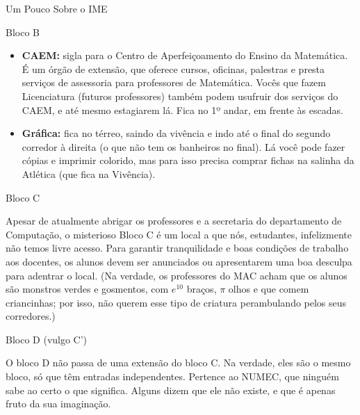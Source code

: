 \begin{secao}{Um Pouco Sobre o IME}
\begin{subsecao}{Bloco B}
\begin{itemize}
\item {\bf CAEM:} sigla para o Centro de Aperfeiçoamento do Ensino da
  Matemática. É um órgão de extensão, que oferece cursos, oficinas, palestras e
  presta serviços de assessoria para professores de Matemática. Vocês que fazem
  Licenciatura (futuros professores) também podem usufruir dos serviços do CAEM,
  e até mesmo estagiarem lá. Fica no 1º andar, em frente às escadas.

\item{\bf Gráfica:} fica no térreo, saindo da vivência e indo até o final do segundo
  corredor à direita (o que não tem os banheiros no final). Lá você pode fazer cópias
  e imprimir colorido, mas para isso precisa comprar fichas na salinha da Atlética (que fica na Vivência).
\end{itemize}

\end{subsecao}






\begin{subsecao}{Bloco C}

Apesar de atualmente abrigar os professores e a secretaria do departamento de
Computação, o misterioso Bloco C é um local a que nós, estudantes, infelizmente não
temos livre acesso. Para garantir tranquilidade e boas condições de trabalho aos
docentes, os alunos devem ser anunciados ou apresentarem uma boa desculpa para
adentrar o local. (Na verdade, os professores do MAC acham que os alunos são monstros
verdes e gosmentos, com $e^{10}$ braços, $\pi$ olhos e que comem criancinhas;
por isso, não querem esse tipo de criatura perambulando pelos seus corredores.)

\end{subsecao}

\begin{subsecao}{Bloco D (vulgo C')}

O bloco D não passa de uma extensão do bloco C. Na verdade, eles são o mesmo bloco,
só que têm entradas independentes. Pertence ao NUMEC, que ninguém sabe ao certo
o que significa. Alguns dizem que ele não existe, e que é apenas fruto da sua
imaginação.

\end{subsecao}


\end{secao}
